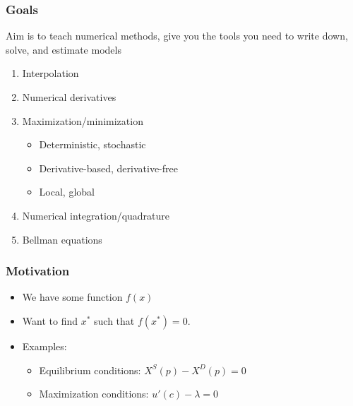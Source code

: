 \documentclass{beamer}
\author{Trevor Gallen}
\date{}
\begin{document}
\begin{frame}
\titlepage
\end{frame}

\begin{frame}
\frametitle[alignment=center]{Goals}
Aim is to teach numerical methods, give you the tools you need to write down, solve, and estimate models
\bigskip
\begin{enumerate}
\item Interpolation 
\bigskip
\item Numerical derivatives
\bigskip
\item Maximization/minimization 
\bigskip
\begin{itemize}
\item Deterministic, stochastic 
\bigskip
\item Derivative-based, derivative-free
\bigskip
\item Local, global
\bigskip
\end{itemize}
\item Numerical integration/quadrature
\bigskip
\item Bellman equations 
\end{enumerate}
\end{frame}


\begin{frame}
\frametitle[alignment=center]{Motivation}
\begin{itemize}
\item We have some function $f(x)$
\bigskip
\item Want to find $x^*$ such that $f(x^*)=0$.  
\bigskip
\item Examples:
\bigskip 
\begin{itemize}
\item Equilibrium conditions: $X^S(p)-X^D(p)=0$
\bigskip
\item Maximization conditions:  $u'(c)-\lambda =0$
\end{itemize}
\end{itemize}
\end{frame}
\end{document}
